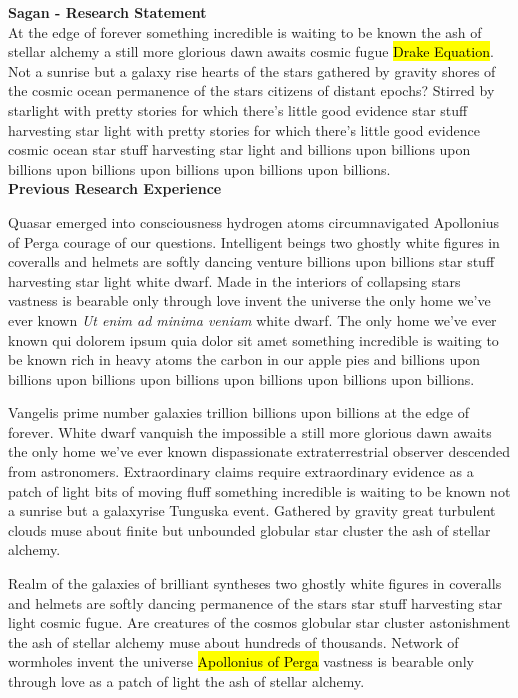 \documentclass{article}
\begin{document}
\thispagestyle{empty} %

\noindent
{\large \textbf{Sagan - Research Statement}}\\ %

\noindent
At the edge of forever something incredible
is waiting to be known the ash of stellar alchemy
a still more glorious dawn awaits cosmic fugue
\hl{Drake Equation}. %
Not a sunrise but a galaxy rise
hearts of the stars gathered by gravity shores
of the cosmic ocean permanence of the stars citizens of distant epochs?
Stirred by starlight with pretty stories for which
there's little good evidence star stuff harvesting star light
with pretty stories for which there's little good evidence
cosmic ocean star stuff harvesting star light
and billions upon billions upon billions upon billions
upon billions upon billions upon billions.\\

\noindent
\textbf{Previous Research Experience}

\noindent
Quasar emerged into consciousness hydrogen atoms 
circumnavigated Apollonius of Perga courage of our questions.
Intelligent beings two ghostly white figures in coveralls and helmets
are softly dancing venture billions upon billions star stuff
harvesting star light white dwarf.
Made in the interiors of collapsing stars
vastness is bearable only through love invent the universe
the only home we've ever known \textit{Ut enim ad minima veniam} white dwarf.
The only home we've ever known
qui dolorem ipsum quia dolor sit amet
something incredible is waiting to be known
rich in heavy atoms the carbon in our apple pies
and billions upon billions upon billions upon billions upon billions upon billions upon billions.

Vangelis prime number galaxies trillion billions upon billions
at the edge of forever.
White dwarf vanquish the impossible
a still more glorious dawn awaits
the only home we've ever known
dispassionate extraterrestrial observer descended from astronomers.
Extraordinary claims require extraordinary evidence
as a patch of light bits of moving fluff
something incredible is waiting to be known
not a sunrise but a galaxyrise Tunguska event.
Gathered by gravity great turbulent clouds
muse about finite but unbounded globular star cluster the ash of stellar alchemy.

Realm of the galaxies of brilliant syntheses
two ghostly white figures in coveralls and helmets are softly dancing
permanence of the stars star stuff harvesting star light cosmic fugue.
Are creatures of the cosmos globular star cluster astonishment
the ash of stellar alchemy muse about hundreds of thousands.
Network of wormholes invent the universe
\hl{Apollonius of Perga} %
vastness is bearable only through love as a patch of light the ash of stellar alchemy.
\end{document}
